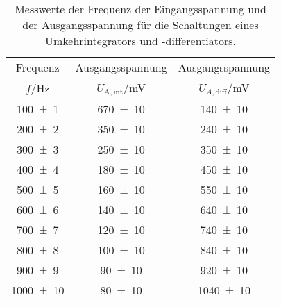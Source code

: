 \begin{table}[!h]
	\centering
	\begin{tabular}{ccc}
		\toprule
		Frequenz & Ausgangsspannung & Ausgangsspannung\\
		$f$/\si{\hertz} & $U_{\mathrm{A},\mathrm{int}}$/\si{\milli\volt} & $U_{A,\mathrm{diff}}$/\si{\milli\volt}\\
\midrule
		\num{100(1)} & \num{670(10)} & \num{140(10)}\\
		\num{200(2)} & \num{350(10)} & \num{240(10)}\\
		\num{300(3)} & \num{250(10)} & \num{350(10)}\\
		\num{400(4)} & \num{180(10)} & \num{450(10)}\\
		\num{500(5)} & \num{160(10)} & \num{550(10)}\\
		\num{600(6)} & \num{140(10)} & \num{640(10)}\\
		\num{700(7)} & \num{120(10)} & \num{740(10)}\\
		\num{800(8)} & \num{100(10)} & \num{840(10)}\\
		\num{900(9)} & \num{90(10)} & \num{920(10)}\\
		\num{1000(10)} & \num{80(10)} & \num{1040(10)}\\
		\bottomrule
	\end{tabular}
	\caption{ Messwerte der Frequenz der Eingangsspannung und der Ausgangsspannung für die Schaltungen eines Umkehrintegrators und -differentiators. \label{tab:integrator_differentiator}}
\end{table}
